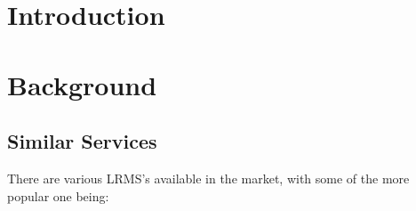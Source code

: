 \documentclass[12pt, a4paper,twoside]{report}
\theoremstyle{plain} %
\theoremstyle{definition} %
\numberwithin{equation}{chapter}
\begin{document}

\tableofcontents


\chapter{Introduction}\label{ch:introduction}


\chapter{Background}\label{ch:background}

\section{Similar Services}\label{sec:similarservices}

There are various LRMS's available in the market, with some of the more popular
one being:
\end{document}

